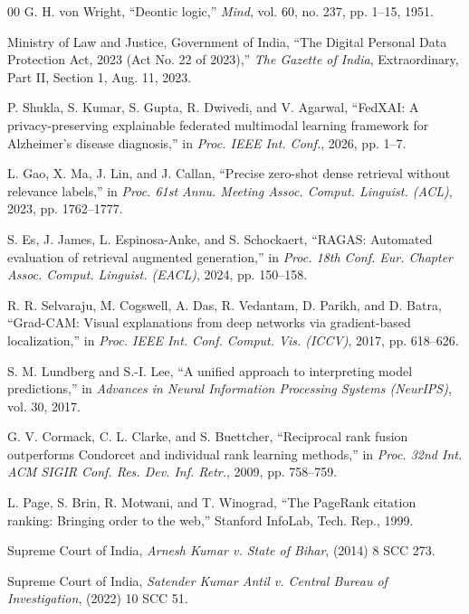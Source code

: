 \documentclass[conference]{IEEEtran}
\begin{document}
\begin{thebibliography}{00}
G. H. von Wright, ``Deontic logic,'' \textit{Mind}, vol. 60, no. 237, pp. 1--15, 1951.

Ministry of Law and Justice, Government of India, ``The Digital Personal Data Protection Act, 2023 (Act No. 22 of 2023),'' \textit{The Gazette of India}, Extraordinary, Part II, Section 1, Aug. 11, 2023.

P. Shukla, S. Kumar, S. Gupta, R. Dwivedi, and V. Agarwal, ``FedXAI: A privacy-preserving explainable federated multimodal learning framework for Alzheimer's disease diagnosis,'' in \textit{Proc. IEEE Int. Conf.}, 2026, pp. 1--7.

L. Gao, X. Ma, J. Lin, and J. Callan, ``Precise zero-shot dense retrieval without relevance labels,'' in \textit{Proc. 61st Annu. Meeting Assoc. Comput. Linguist. (ACL)}, 2023, pp. 1762--1777.

S. Es, J. James, L. Espinosa-Anke, and S. Schockaert, ``RAGAS: Automated evaluation of retrieval augmented generation,'' in \textit{Proc. 18th Conf. Eur. Chapter Assoc. Comput. Linguist. (EACL)}, 2024, pp. 150--158.

R. R. Selvaraju, M. Cogswell, A. Das, R. Vedantam, D. Parikh, and D. Batra, ``Grad-CAM: Visual explanations from deep networks via gradient-based localization,'' in \textit{Proc. IEEE Int. Conf. Comput. Vis. (ICCV)}, 2017, pp. 618--626.

S. M. Lundberg and S.-I. Lee, ``A unified approach to interpreting model predictions,'' in \textit{Advances in Neural Information Processing Systems (NeurIPS)}, vol. 30, 2017.

G. V. Cormack, C. L. Clarke, and S. Buettcher, ``Reciprocal rank fusion outperforms Condorcet and individual rank learning methods,'' in \textit{Proc. 32nd Int. ACM SIGIR Conf. Res. Dev. Inf. Retr.}, 2009, pp. 758--759.

L. Page, S. Brin, R. Motwani, and T. Winograd, ``The PageRank citation ranking: Bringing order to the web,'' Stanford InfoLab, Tech. Rep., 1999.

Supreme Court of India, \textit{Arnesh Kumar v. State of Bihar}, (2014) 8 SCC 273.

Supreme Court of India, \textit{Satender Kumar Antil v. Central Bureau of Investigation}, (2022) 10 SCC 51.


\end{thebibliography}
\end{document}
